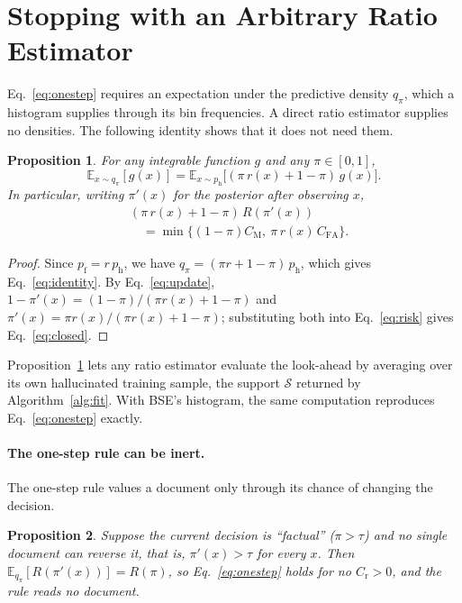 \documentclass[11pt]{article}
\newtheorem{proposition}{Proposition}
\newcommand{\E}{\mathbb{E}}
\newcommand{\CM}{C_{\mathrm{M}}}
\newcommand{\CFA}{C_{\mathrm{FA}}}
\newcommand{\Cr}{C_{\mathrm{r}}}
\newcommand{\pf}{p_{\mathrm{f}}}
\newcommand{\ph}{p_{\mathrm{h}}}
\begin{document}
\section{Stopping with an Arbitrary Ratio Estimator}
\label{sec:stopping}

Eq.~\ref{eq:onestep} requires an expectation under the predictive density
$q_\pi$, which a histogram supplies through its bin frequencies. A direct
ratio estimator supplies no densities. The following identity shows that it
does not need them.

\begin{proposition}
\label{prop:identity}
For any integrable function $g$ and any $\pi \in [0, 1]$,
\begin{equation}
\E_{x \sim q_\pi}[g(x)] = \E_{x \sim \ph}\bigl[(\pi\, r(x) + 1 - \pi)\, g(x)\bigr].
\label{eq:identity}
\end{equation}
In particular, writing $\pi'(x)$ for the posterior after observing $x$,
\begin{equation}
\begin{split}
&(\pi\, r(x) + 1 - \pi)\, R(\pi'(x)) \\
&\quad= \min\bigl\{(1 - \pi)\CM,\ \pi\, r(x)\, \CFA\bigr\}.
\end{split}
\label{eq:closed}
\end{equation}
\end{proposition}

\begin{proof}
Since $\pf = r\, \ph$, we have $q_\pi = (\pi r + 1 - \pi)\, \ph$, which gives
Eq.~\ref{eq:identity}. By Eq.~\ref{eq:update},
$1 - \pi'(x) = (1 - \pi)/(\pi r(x) + 1 - \pi)$ and
$\pi'(x) = \pi r(x)/(\pi r(x) + 1 - \pi)$; substituting both into
Eq.~\ref{eq:risk} gives Eq.~\ref{eq:closed}.
\end{proof}

Proposition~\ref{prop:identity} lets any ratio estimator evaluate the
look-ahead by averaging over its own hallucinated training sample, the support
$\mathcal{S}$ returned by Algorithm~\ref{alg:fit}. With BSE's histogram, the
same computation reproduces Eq.~\ref{eq:onestep} exactly.

\paragraph{The one-step rule can be inert.} The one-step rule values a document
only through its chance of changing the decision.

\begin{proposition}
\label{prop:inert}
Suppose the current decision is ``factual'' ($\pi > \tau$) and no single
document can reverse it, that is, $\pi'(x) > \tau$ for every $x$. Then
$\E_{q_\pi}[R(\pi'(x))] = R(\pi)$, so Eq.~\ref{eq:onestep} holds for no
$\Cr > 0$, and the rule reads no document.
\end{proposition}
\end{document}
